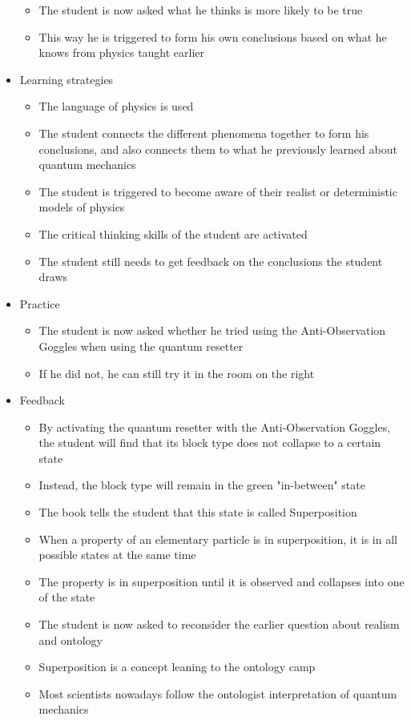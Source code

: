 \documentclass[11pt,twoside]{report} %
\begin{document}
\begin{itemize}
\begin{itemize}
			\item The student is now asked what he thinks is more likely to be true
			\item This way he is triggered to form his own conclusions based on what he knows from physics taught earlier
		\end{itemize}
		\item Learning strategies
		\begin{itemize}
			\item The language of physics is used
			\item The student connects the different phenomena together to form his conclusions, and also connects them to what he previously learned about quantum mechanics
			\item The student is triggered to become aware of their realist or deterministic models of physics
			\item The critical thinking skills of the student are activated
			\item The student still needs to get feedback on the conclusions the student draws
		\end{itemize}
		\item Practice
		\begin{itemize}
			\item The student is now asked whether he tried using the Anti-Observation Goggles when using the quantum resetter
			\item If he did not, he can still try it in the room on the right
		\end{itemize}
		\item Feedback
		\begin{itemize}
			\item By activating the quantum resetter with the Anti-Observation Goggles, the student will find that its block type does not collapse to a certain state
			\item Instead, the block type will remain in the green "in-between" state
			\item The book tells the student that this state is called Superposition
			\item When a property of an elementary particle is in superposition, it is in all possible states at the same time
			\item The property is in superposition until it is observed and collapses into one of the state
			\item The student is now asked to reconsider the earlier question about realism and ontology
			\item Superposition is a concept leaning to the ontology camp
			\item Most scientists nowadays follow the ontologist interpretation of quantum mechanics
		\end{itemize}
	\end{itemize}
\end{document}
